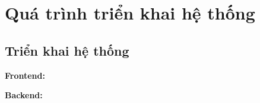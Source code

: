 \section{Quá trình triển khai hệ thống}
\subsection*{Triển khai hệ thống}

\textbf{Frontend:}



\textbf{Backend:}




